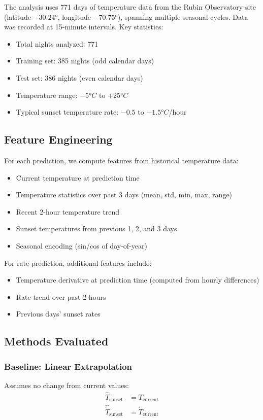 \documentclass[11pt,letterpaper]{article}
\begin{document}
The analysis uses 771 days of temperature data from the Rubin Observatory site (latitude $-30.24°$, longitude $-70.75°$), spanning multiple seasonal cycles. Data was recorded at 15-minute intervals. Key statistics:

\begin{itemize}
    \item Total nights analyzed: 771
    \item Training set: 385 nights (odd calendar days)
    \item Test set: 386 nights (even calendar days)
    \item Temperature range: $-5°C$ to $+25°C$
    \item Typical sunset temperature rate: $-0.5$ to $-1.5°C$/hour
\end{itemize}

\subsection{Feature Engineering}

For each prediction, we compute features from historical temperature data:

\begin{itemize}
    \item Current temperature at prediction time
    \item Temperature statistics over past 3 days (mean, std, min, max, range)
    \item Recent 2-hour temperature trend
    \item Sunset temperatures from previous 1, 2, and 3 days
    \item Seasonal encoding (sin/cos of day-of-year)
\end{itemize}

For rate prediction, additional features include:
\begin{itemize}
    \item Temperature derivative at prediction time (computed from hourly differences)
    \item Rate trend over past 2 hours
    \item Previous days' sunset rates
\end{itemize}

\subsection{Methods Evaluated}

\subsubsection{Baseline: Linear Extrapolation}
Assumes no change from current values:
\begin{align}
    \hat{T}_\text{sunset} &= T_\text{current} \\
    \hat{\dot{T}}_\text{sunset} &= \dot{T}_\text{current}
\end{align}
\end{document}
